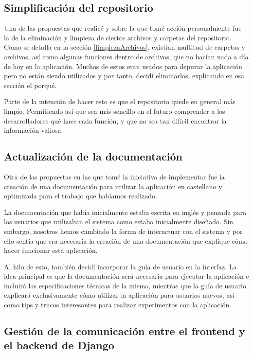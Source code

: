 \subsection*{Simplificación del repositorio}

Una de las propuestas que realicé y sobre la que tomé acción personalmente fue la de la eliminación y limpieza de ciertos archivos y carpetas del repositorio. Como se detalla en la sección \ref{limpiezaArchivos}, existían multitud de carpetas y archivos, así como algunas funciones dentro de archivos, que no hacían nada a día de hoy en la aplicación. Muchos de estos eran usados para depurar la aplicación pero no están siendo utilizados y por tanto, decidí eliminarlos, explicando en esa sección el porqué.

Parte de la intención de hacer esto es que el repositorio quede en general más limpio. Permitiendo así que sea más sencillo en el futuro comprender a los desarrolladores qué hace cada función, y que no sea tan difícil encontrar la información valiosa.

\subsection*{Actualización de la documentación}

Otra de las propuestas en las que tomé la iniciativa de implementar fue la creación de una documentación para utilizar la aplicación en castellano y optimizada para el trabajo que habíamos realizado.

La documentación que había inicialmente estaba escrita en inglés y pensada para los usuarios que utilizaban el sistema como estaba inicialmente diseñado. Sin embargo, nosotros hemos cambiado la forma de interactuar con el sistema y por ello sentía que era necesaria la creación de una documentación que explique cómo hacer funcionar esta aplicación.

Al hilo de esto, también decidí incorporar la guía de usuario en la interfaz. La idea principal es que la documentación será necesaria para ejecutar la aplicación e incluirá las especificaciones técnicas de la misma, mientras que la guía de usuario explicará exclusivamente cómo utilizar la aplicación para usuarios nuevos, así como tips y trucos interesantes para realizar experimentos con la aplicación.

\subsection*{Gestión de la comunicación entre el frontend y el backend de Django}

